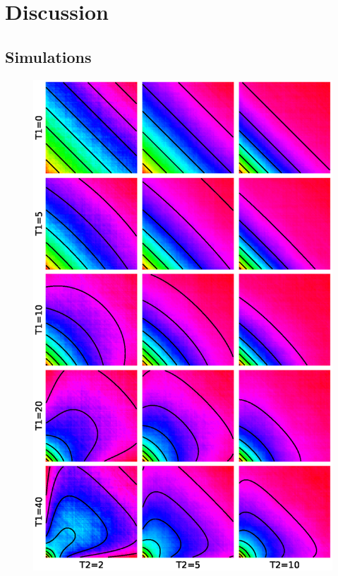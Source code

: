 \section{Discussion}
\subsection{Simulations}

\begin{figure}
\includegraphics[scale=.6]{Ts.eps}\caption{
}
\end{figure}
